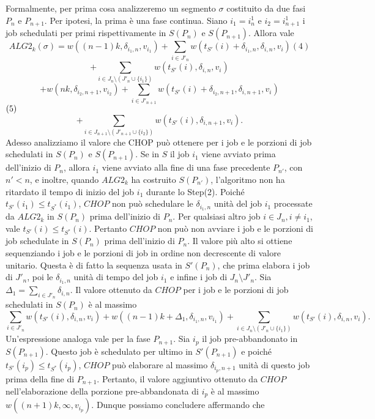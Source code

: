 \documentclass[12pt]{article}
\begin{document}
Formalmente, per prima cosa analizzeremo un segmento $\sigma$ costituito da due fasi $P_{n}$ e $P_{n + 1}$.
Per ipotesi, la prima è una fase continua. Siano $i_{1} = i_{n}^{1}$ e $i_{2} = i_{n+1}^{1}$ i job schedulati per primi rispettivamente in $S(P_{n})$ e $S(P_{n + 1})$. Allora vale
$$ALG2_{k}(\sigma) = w ((n - 1)k, \delta_{i_{1},n}, v_{i_{1}}) + \sum_{i \in J'_{n}} w(t_{S'}(i) + \delta_{i_{1},n}, \delta_{i,n}, v_{i}) (4)$$
$$+ \sum_{i \in J_{n} \setminus (J'_{n} \cup \{i_{1}\})} w (t_{S'} (i), \delta_{i,n}, v_{i})$$
$$+ w (nk, \delta_{i_{2}, n+1}, v_{i_{2}}) + \sum_{i \in J'_{n+1}} w(t_{S'} (i) + \delta_{i_{2}, n+1}, \delta_{i,n+1}, v_{i}) $$ $\hfill (5)$
$$+ \sum_{i \in J_{n+1} \setminus (J'_{n+1} \cup \{i_{2}\})} w (t_{S'} (i), \delta_{i,n+1}, v_{i}).$$
Adesso analizziamo il valore che CHOP può ottenere per i job e le porzioni di job schedulati in $S(P_{n})$ e $S(P_{n + 1})$. Se in $S$ il job $i_{1}$ viene avviato prima dell'inizio di $P_{n}$, allora $i_{1}$ viene avviato alla fine di una fase precedente $P_{n'}$, con $n' < n$, e inoltre, quando $ALG2_{k}$ ha costruito $S(P_{n'})$, l'algoritmo non ha ritardato il tempo di inizio del job $i_{1}$ durante lo Step(2). Poiché $t_{S'} (i_{1}) \leq t_{S^{*}}(i_{1})$, $CHOP$ non può schedulare le $\delta_{i_{1},n}$ unità del job $i_{1}$ processate da $ALG2_{k}$ in $S(P_{n})$ prima dell'inizio di $P_{n}$. Per qualsiasi altro job $i \in J_{n}, i \neq i_{1}$, vale $t_{S'}(i) \leq t_{S^{*}} (i)$. Pertanto $CHOP$ non può non avviare i job e le porzioni di job schedulate in $S(P_{n})$ prima dell'inizio di $P_{n}$. Il valore più alto si ottiene sequenziando i job e le porzioni di job in ordine non decrescente di valore unitario. Questa è di fatto la sequenza usata in $S'(P_{n})$, che prima elabora i job di $J'_{n}$, poi le  $\delta_{i_{1},n}$ unità di tempo del job $i_{1}$ e infine i job di $J_{n} \setminus J'_{n}$. Sia 
$\Delta_{1} = \sum_{i \in J'_{n}} \delta_{i,n}$. Il valore ottenuto da $CHOP$ per i job e le porzioni di job schedulati in $S(P_{n})$ è al massimo
$$ \sum_{i \in J'_{n}} w(t_{S'}(i), \delta_{i,n}, v_{i}) + w ((n - 1) k + \Delta_{1}, \delta_{i_{1},n}, v_{i_{1}}) + \sum_{i \in J_{n} \setminus (J'_{n}\cup \{i_{1}\})} w (t_{S'} (i), \delta_{i,n},v_{i}).$$
Un'espressione analoga vale per la fase $P_{n + 1}$. Sia $i_{p}$ il job pre-abbandonato in $S(P_{n + 1})$. Questo job è schedulato per ultimo in $S'(P_{n + 1})$ e poiché $t_{S'}(i_{p}) \leq t_{S^{*}} (i_{p})$, $CHOP$ può elaborare al massimo $\delta_{i_{p}, n+1}$ unità di questo job prima della fine di $P_{n + 1}$. Pertanto, il valore aggiuntivo ottenuto da $CHOP$ nell'elaborazione della porzione pre-abbandonata di $i_{p}$ è al massimo $w ((n + 1) k, \infty,v_{i_{p}}).$ Dunque possiamo concludere affermando che
\end{document}
